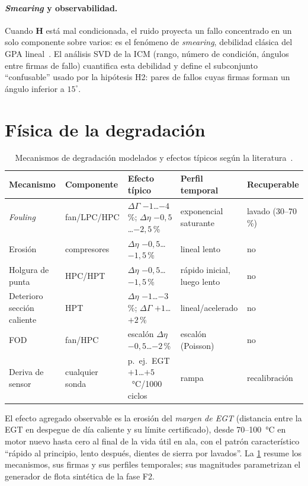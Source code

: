\paragraph{\emph{Smearing} y observabilidad.} Cuando $\mathbf{H}$ está mal condicionada, el
ruido proyecta un fallo concentrado en un solo componente sobre varios: es el fenómeno de
\emph{smearing}, debilidad clásica del GPA lineal~\cite{Li2002}. El análisis SVD de la ICM
(rango, número de condición, ángulos entre firmas de fallo) cuantifica esta debilidad y define
el subconjunto ``confusable'' usado por la hipótesis H2: pares de fallos cuyas firmas forman un
ángulo inferior a $15^{\circ}$.

\section{Física de la degradación}
\label{sec:degradacion}

\begin{table}[htbp]
  \centering\small
  \caption{Mecanismos de degradación modelados y efectos típicos según la
  literatura~\cite{Diakunchak1992,Kurz2012}.}
  \label{tab:degradacion}
  \begin{tabular}{p{3.2cm}p{2.2cm}p{3.6cm}p{2.6cm}p{1.6cm}}
    \toprule
    Mecanismo & Componente & Efecto típico & Perfil temporal & Recuperable \\
    \midrule
    \emph{Fouling} & fan/LPC/HPC & $\Delta\Gamma$ $-1$\ldots$-4$\,\%; $\Delta\eta$ $-0{,}5$\ldots$-2{,}5$\,\% & exponencial saturante & lavado (30--70\,\%) \\
    Erosión & compresores & $\Delta\eta$ $-0{,}5$\ldots$-1{,}5$\,\% & lineal lento & no \\
    Holgura de punta & HPC/HPT & $\Delta\eta$ $-0{,}5$\ldots$-1{,}5$\,\% & rápido inicial, luego lento & no \\
    Deterioro sección caliente & HPT & $\Delta\eta$ $-1$\ldots$-3$\,\%; $\Delta\Gamma$ $+1$\ldots$+2$\,\% & lineal/acelerado & no \\
    FOD & fan/HPC & escalón $\Delta\eta$ $-0{,}5$\ldots$-2$\,\% & escalón (Poisson) & no \\
    Deriva de sensor & cualquier sonda & p.\ ej.\ EGT $+1$\ldots$+5$~\si{\degreeCelsius}/1000 ciclos & rampa & recalibración \\
    \bottomrule
  \end{tabular}
\end{table}

El efecto agregado observable es la erosión del \emph{margen de EGT} (distancia entre la EGT en
despegue de día caliente y su límite certificado), desde \SI{70}{}--\SI{100}{\degreeCelsius} en motor
nuevo hasta cero al final de la vida útil en ala, con el patrón característico ``rápido al
principio, lento después, dientes de sierra por lavados''. La \cref{tab:degradacion} resume los
mecanismos, sus firmas y sus perfiles temporales; sus magnitudes parametrizan el generador de
flota sintética de la fase F2.
